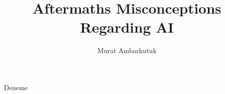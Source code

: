 \documentclass[man]{apa6}
\title{Aftermaths Misconceptions Regarding AI}
\author{Murat Ambarkutuk}
\affiliation{English Language Institute, University of Delaware \\ murata@udel.edu}
\begin{document}
\maketitle
Deneme


\end{document}
